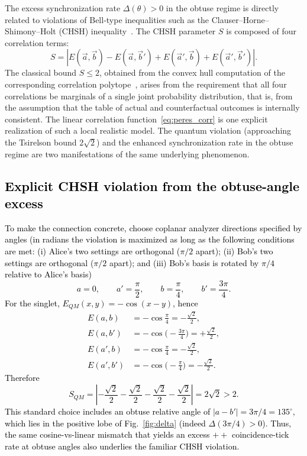 \documentclass[reprint,aps,pra,longbibliography]{revtex4-2}
\newcommand{\rev}[1]{\textcolor{black}{#1}} %
\begin{document}
The excess synchronization rate $\Delta(\theta) > 0$ in the obtuse regime is directly related to violations of Bell-type inequalities such as the Clauser--Horne--Shimony--Holt (CHSH) inequality~\cite{chsh}.
The CHSH parameter $S$ is composed of four correlation terms:
\begin{equation}
S = |E(\vec{a},\vec{b}) - E(\vec{a},\vec{b}') + E(\vec{a}',\vec{b}) + E(\vec{a}',\vec{b}')|.
\end{equation}
The classical bound $S \le 2$, obtained from the convex hull computation of the corresponding correlation polytope~\cite{froissart-81,pitowsky-86}, arises from the requirement that all four correlations be marginals of a single joint probability distribution, that is, from the assumption that the table of actual and counterfactual outcomes is internally consistent.
The linear correlation function~\eqref{eq:peres_corr} is one explicit realization of such a local realistic model.
The quantum violation (approaching the Tsirelson bound $2\sqrt{2}$) and the enhanced synchronization rate in the obtuse regime are two manifestations of the same underlying phenomenon.

\rev{\subsection{Explicit CHSH violation from the obtuse-angle excess}}
\rev{To make the connection concrete, choose coplanar analyzer directions
specified by angles (in radians the violation is maximized as long as the following conditions are met: (i)  Alice's two settings are orthogonal ($\pi/2$ apart); (ii)  Bob's two settings are orthogonal ($\pi/2$ apart); and (iii) Bob's basis is rotated by $\pi/4$ relative to Alice's basis)
\[
a=0,\qquad a'=\frac{\pi}{2},\qquad b=\frac{\pi}{4},\qquad b'=\frac{3\pi}{4}.
\]
For the singlet, $E_{QM}(x,y)=-\cos(x-y)$, hence
\begin{align}
E(a,b)&=-\cos\frac{\pi}{4}=-\frac{\sqrt2}{2},
\nonumber \\
E(a,b')&=-\cos\!\Big(\!-\frac{3\pi}{4}\Big)=+\frac{\sqrt2}{2},
\nonumber \\
E(a',b)&=-\cos\frac{\pi}{4}=-\frac{\sqrt2}{2},
\nonumber \\
E(a',b')&=-\cos\!\Big(\!-\frac{\pi}{4}\Big)=-\frac{\sqrt2}{2}. \nonumber
\end{align}
Therefore
\[
S_{QM}=\left|-\frac{\sqrt2}{2}-\frac{\sqrt2}{2}-\frac{\sqrt2}{2}-\frac{\sqrt2}{2}\right|=2\sqrt2>2.
\]
This standard choice includes an obtuse relative angle of $|a-b'|=3\pi/4=135^\circ$, which lies in the positive lobe of Fig.~\ref{fig:delta} (indeed $\Delta(3\pi/4)>0$). Thus, the same cosine-vs-linear mismatch that yields an excess $++$ coincidence-tick rate at obtuse angles also underlies the familiar CHSH violation.}
\end{document}
